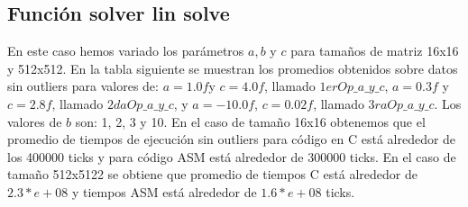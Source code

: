 \subsection{Función solver lin solve}
En este caso hemos variado los parámetros $a,b$ y $c$ para tamaños de matriz 16x16 y 512x512. En la tabla siguiente se muestran los promedios obtenidos sobre datos sin outliers para valores de: $a = 1.0f $y $c = 4.0f$, llamado $1erOp\_a\_y\_c$, $a = 0.3f$ y $c = 2.8f$, llamado $2daOp\_a\_y\_c$, y $a = -10.0f$, $c = 0.02f$, llamado $3raOp\_a\_y\_c$. Los valores de $b$ son: 1, 2, 3 y 10. En el caso de tamaño 16x16 obtenemos que el promedio de tiempos de ejecución sin outliers para código en C está alrededor de los 400000 ticks y para código ASM está alrededor de 300000 ticks. En el caso de tamaño 512x5122 se obtiene que promedio de tiempos C está alrededor de $2.3*e+08$ y tiempos ASM está alrededor de $1.6*e+08 $ ticks.\newline
